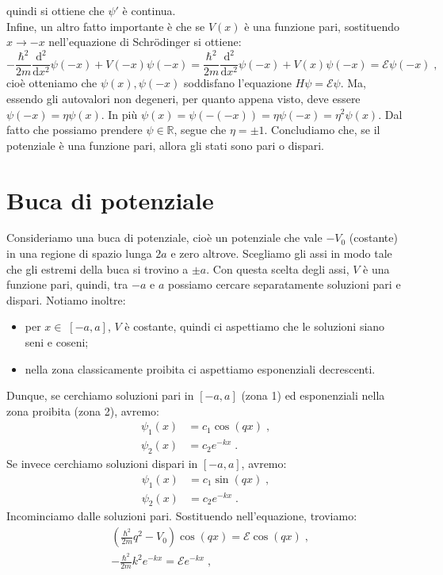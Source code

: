 \documentclass[12pt,a4paper]{report}
\theoremstyle{definition}
\numberwithin{equation}{section}
\newcommand{\diff}[1][]{\mathrm{d}#1}
\begin{document}
quindi si ottiene che $\psi'$ è continua. \\
Infine, un altro fatto importante è che se $V(x)$ è una funzione pari, sostituendo $x\to -x$ nell'equazione di Schrödinger si ottiene:
$$
-\frac{\hbar^2}{2m}\frac{\mathrm{d}^2}{\diff{x}^2}\psi(-x)+V(-x)\psi(-x)=\frac{\hbar^2}{2m}\frac{\mathrm{d}^2}{\diff{x}^2}\psi(-x)+V(x)\psi(-x)=\mathcal{E}\psi(-x)\;,
$$
cioè otteniamo che $\psi(x),\psi(-x)$ soddisfano l'equazione $H\psi=\mathcal{E}\psi$. Ma, essendo gli autovalori non degeneri, per quanto appena visto, deve essere $\psi(-x)=\eta\psi(x)$. In più $\psi(x)=\psi(-(-x))=\eta\psi(-x)=\eta^2\psi(x)$. Dal fatto che possiamo prendere $\psi\in\mathbb{R}$, segue che $\eta=\pm 1$. Concludiamo che, se il potenziale è una funzione pari, allora gli stati sono pari o dispari.
\section{Buca di potenziale}
Consideriamo una buca di potenziale, cioè un potenziale che vale $-V_0$ (costante) in una regione di spazio lunga $2a$ e zero altrove. Scegliamo gli assi in modo tale che gli estremi della buca si trovino a $\pm a$. Con questa scelta degli assi, $V$ è una funzione pari, quindi, tra $-a$ e $a$ possiamo cercare separatamente soluzioni pari e dispari. Notiamo inoltre:
\begin{itemize}
\item per $x\in\;[-a,a]$, $V$ è costante, quindi ci aspettiamo che le soluzioni siano seni e coseni;
\item nella zona classicamente proibita ci aspettiamo esponenziali decrescenti.
\end{itemize}
Dunque, se cerchiamo soluzioni pari in $[-a,a]$ (zona 1) ed esponenziali nella zona proibita (zona 2), avremo:
\begin{align*}
\psi_1(x) &= c_1\cos(qx)\;, \\
\psi_2(x) &= c_2 e^{-kx}\;.
\end{align*}
Se invece cerchiamo soluzioni dispari in $[-a,a]$, avremo:
\begin{align*}
\psi_1(x) &= c_1\sin(qx)\;, \\
\psi_2(x) &= c_2 e^{-kx}\;.
\end{align*}
Incominciamo dalle soluzioni pari. Sostituendo nell'equazione, troviamo:
\begin{align}
&\left(\frac{\hbar^2}{2m}q^2-V_0\right)\cos(qx) =\mathcal{E}\cos(qx)\;, \label{ch3_sol1} \\
&-\frac{\hbar^2}{2m}k^2e^{-kx}=\mathcal{E}e^{-kx}\;, \label{ch3_sol2}
\end{align}
\end{document}
